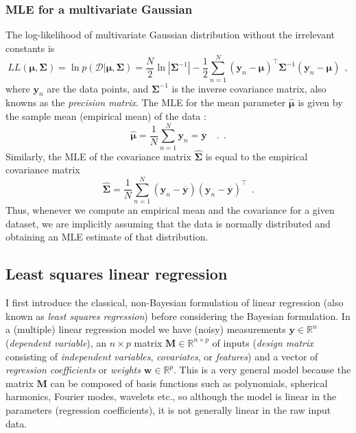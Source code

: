 \documentclass[12pt,dvipsnames]{report}
\renewcommand{\vec}[1]{\boldsymbol{\mathbf{#1}}}
\newcommand{\hquad}{~~}
\begin{document}
\subsubsection{MLE for a multivariate Gaussian}
The log-likelihood of multivariate Gaussian distribution without the
irrelevant constants is
\begin{equation}
    L L(\boldsymbol{\mu}, \boldsymbol{\Sigma})=\ln p(\mathcal{D} \lvert \boldsymbol{\mu}, \boldsymbol{\Sigma})=\frac{N}{2} \ln |\vec{\Sigma}^{-1}|-\frac{1}{2} \sum_{n=1}^{N}\left(\boldsymbol{y}_{n}-\boldsymbol{\mu}\right)^{\intercal} \vec{\Sigma}^{-1}\left(\boldsymbol{y}_{n}-\boldsymbol{\mu}\right)
    \hquad,
\end{equation}
where $\vec{y}_n$ are the data points, and $\vec{\Sigma}^{-1}$ is
the inverse covariance matrix, also knowns as the \emph{precision matrix}.
The MLE for the mean parameter $\hat{\vec{\mu}}$
is given by the sample mean (empirical mean) of the data \citep{murphy_book_2022}:
\begin{equation}
    \hat{\boldsymbol{\mu}}=\frac{1}{N} \sum_{n=1}^{N} \boldsymbol{y}_{n}=\overline{\boldsymbol{y}}\quad .
    \hquad.
\end{equation}
Similarly, the MLE of the covariance matrix $\hat{\vec{\Sigma}}$ is equal to
the empirical covariance matrix
\begin{equation}
    \hat{\boldsymbol{\Sigma}}=\frac{1}{N} \sum_{n=1}^{N}\left(\boldsymbol{y}_{n}-\overline{\boldsymbol{y}}\right)\left(\boldsymbol{y}_{n}-\overline{\boldsymbol{y}}\right)^{\intercal}
    \hquad.
\end{equation}
Thus, whenever we compute an empirical mean and the covariance for a given dataset, we
are implicitly assuming that the data is normally distributed and obtaining an MLE
estimate of that distribution.

\subsection{Least squares linear regression}
\label{ssec:least_squares}
I first introduce the classical, non-Bayesian formulation of linear
regression (also known as \emph{least squares regression}) before considering the 
Bayesian formulation. In a (multiple) linear regression
model we have (noisy) measurements $\vec{y}\in \mathbb{R}^n$ (\emph{dependent
    variable}), an $n\times p$ matrix $\vec{M}\in \mathbb{R}^{n\times p}$ of inputs
(\emph{design matrix} consisting of \emph{independent variables},
\emph{covariates}, or \emph{features}) and a vector of \emph{regression
    coefficients} or \emph{weights} $\vec{w}\in \mathbb{R}^p$. This is a very
general model because the matrix $\vec{M}$ can be composed of basis functions such
as polynomials, spherical harmonics, Fourier modes, wavelets etc., so although
the model is linear in the parameters (regression coefficients), it is not
generally linear in the raw input data. 
\end{document}
